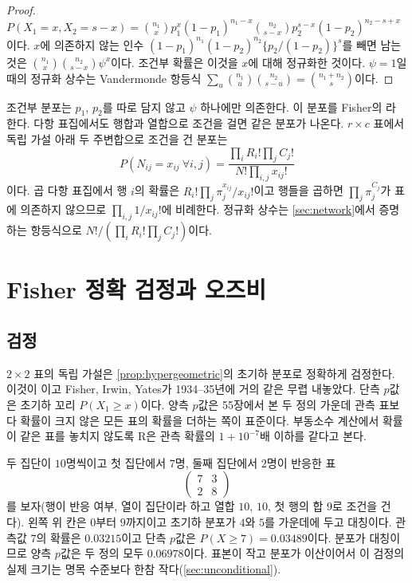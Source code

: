 \begin{proof}
$P(X_1=x,X_2=s-x)=\binom{n_1}xp_1^x(1-p_1)^{n_1-x}\binom{n_2}{s-x}p_2^{s-x}(1-p_2)^{n_2-s+x}$이다. $x$에 의존하지 않는 인수 $(1-p_1)^{n_1}(1-p_2)^{n_2}\{p_2/(1-p_2)\}^s$를 빼면 남는 것은 $\binom{n_1}x\binom{n_2}{s-x}\psi^x$이다. 조건부 확률은 이것을 $x$에 대해 정규화한 것이다. $\psi=1$일 때의 정규화 상수는 Vandermonde 항등식 $\sum_u\binom{n_1}u\binom{n_2}{s-u}=\binom{n_1+n_2}s$이다.
\end{proof}

조건부 분포는 $p_1$, $p_2$를 따로 담지 않고  $\psi$ 하나에만 의존한다. 이 분포를 Fisher의 라 한다. 다항 표집에서도 행합과 열합으로 조건을 걸면 같은 분포가 나온다. $r\times c$ 표에서 독립 가설 아래 두 주변합으로 조건을 건 분포는
\begin{equation}
\label{eq:rxc-prob}
P(N_{ij}=x_{ij}\ \forall i,j)=\frac{\prod_iR_i!\prod_jC_j!}{N!\prod_{i,j}x_{ij}!}
\end{equation}
이다. 곱 다항 표집에서 행 $i$의 확률은 $R_i!\prod_j\pi_j^{x_{ij}}/x_{ij}!$이고 행들을 곱하면 $\prod_j\pi_j^{C_j}$가 표에 의존하지 않으므로 $\prod_{i,j}1/x_{ij}!$에 비례한다. 정규화 상수는 \cref{sec:network}에서 증명하는 항등식으로 $N!/(\prod_iR_i!\prod_jC_j!)$이다.

\section{Fisher 정확 검정과 오즈비}
\label{sec:fisher-exact}

\subsection{검정}

$2\times2$ 표의 독립 가설은 \cref{prop:hypergeometric}의 초기하 분포로 정확하게 검정한다. 이것이 이고 Fisher, Irwin, Yates가 1934--35년에 거의 같은 무렵 내놓았다\cite{fisher1935logic,yates1934}. 단측 $p$값은 초기하 꼬리 $P(X_1\ge x)$이다. 양측 $p$값은 55장에서 본 두 정의 가운데 관측 표보다 확률이 크지 않은 모든 표의 확률을 더하는 쪽이 표준이다. 부동소수 계산에서 확률이 같은 표를 놓치지 않도록 R은 관측 확률의 $1+10^{-7}$배 이하를 같다고 본다.

두 집단이 $10$명씩이고 첫 집단에서 $7$명, 둘째 집단에서 $2$명이 반응한 표
\[
\begin{pmatrix}7&3\\2&8\end{pmatrix}
\]
를 보자(행이 반응 여부, 열이 집단이라 하고 열합 $10$, $10$, 첫 행의 합 $9$로 조건을 건다). 왼쪽 위 칸은 $0$부터 $9$까지이고 초기하 분포가 $4$와 $5$를 가운데에 두고 대칭이다. 관측값 $7$의 확률은 $0.03215$이고 단측 $p$값은 $P(X\ge7)=0.03489$이다. 분포가 대칭이므로 양측 $p$값은 두 정의 모두 $0.06978$이다. 표본이 작고 분포가 이산이어서 이 검정의 실제 크기는 명목 수준보다 한참 작다(\cref{sec:unconditional}).

